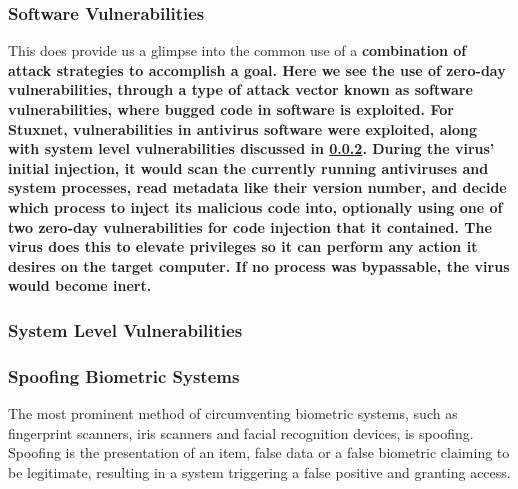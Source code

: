 \documentclass[a4paper, 11pt]{article}
\begin{document}
\subsubsection{Software Vulnerabilities}
\label{sec:softwarevul}
This does provide us a glimpse into the common use of a \bfseries combination \mdseries of attack strategies to accomplish a goal. Here we see the use of zero-day vulnerabilities, through a type of attack vector known as software vulnerabilities, where bugged code in software is exploited. \cite{ref:singer2014cybersecurity} For Stuxnet, vulnerabilities in antivirus software were exploited, along with system level vulnerabilities discussed in  \ref{sec:systemlevel}. During the virus' initial injection, it would scan the currently running antiviruses and system processes, read metadata like their version number, and decide which process to inject its malicious code into, optionally using one of two zero-day vulnerabilities for code injection that it contained. \cite{ref:stuxnet2011report} The virus does this to elevate privileges so it can perform any action it desires on the target computer. \cite{ref:stuxnet2011report} If no process was bypassable, the virus would become inert. \cite{ref:stuxnet2011report}

\subsubsection{System Level Vulnerabilities}
\label{sec:systemlevel}


\subsubsection{Spoofing Biometric Systems}
\label{sec:spoofingbiometric}
The most prominent method of circumventing biometric systems, such as fingerprint scanners, iris scanners and facial recognition devices, is spoofing. \cite{ref:biometricattackvectors} Spoofing is the presentation of an item, false data or a false biometric claiming to be legitimate, resulting in a system triggering a false positive and granting access. \cite{ref:biometricattackvectors}
\end{document}
